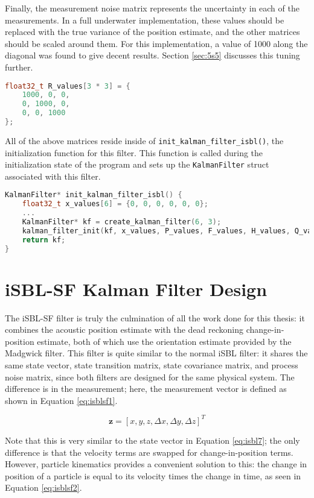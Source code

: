 \documentclass[12pt,a4paper]{report}
\begin{document}
Finally, the measurement noise matrix represents the uncertainty in each of the measurements. In a full underwater implementation, these values should be replaced with the true variance of the position estimate, and the other matrices should be scaled around them. For this implementation, a value of 1000 along the diagonal was found to give decent results. Section \ref{sec:5s5} discusses this tuning further.

\begin{lstlisting}[language=C++]
float32_t R_values[3 * 3] = {
	1000, 0, 0,
	0, 1000, 0,
	0, 0, 1000
};
\end{lstlisting}

All of the above matrices reside inside of \verb|init_kalman_filter_isbl()|, the initialization function for this filter. This function is called during the initialization state of the program and sets up the \verb|KalmanFilter| struct associated with this filter.

\begin{lstlisting}[language=C++]
KalmanFilter* init_kalman_filter_isbl() {
	float32_t x_values[6] = {0, 0, 0, 0, 0, 0};
	...
	KalmanFilter* kf = create_kalman_filter(6, 3);
	kalman_filter_init(kf, x_values, P_values, F_values, H_values, Q_values, R_values);
	return kf;
}
\end{lstlisting}

\section{iSBL-SF Kalman Filter Design} \label{sec:5s4}
The iSBL-SF filter is truly the culmination of all the work done for this thesis: it combines the acoustic position estimate with the dead reckoning change-in-position estimate, both of which use the orientation estimate provided by the Madgwick filter. This filter is quite similar to the normal iSBL filter: it shares the same state vector, state transition matrix, state covariance matrix, and process noise matrix, since both filters are designed for the same physical system. The difference is in the measurement; here, the measurement vector is defined as shown in Equation \ref{eq:isblsf1}.

\begin{equation} \label{eq:isblsf1}
	\mathbf{z} = [x, y, z, \Delta x, \Delta y, \Delta z]^T
\end{equation}

Note that this is very similar to the state vector in Equation \ref{eq:isbl7}; the only difference is that the velocity terms are swapped for change-in-position terms. However, particle kinematics provides a convenient solution to this: the change in position of a particle is equal to its velocity times the change in time, as seen in Equation \ref{eq:isblsf2}. 
\end{document}

